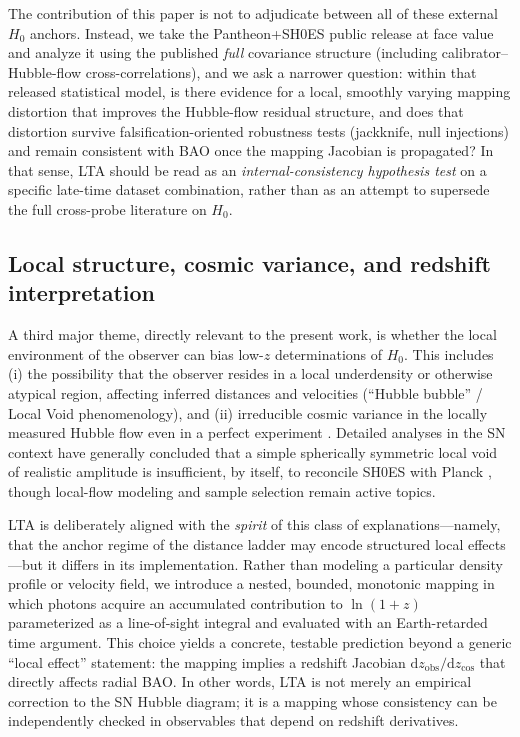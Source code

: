 \documentclass[10pt]{article}
\newcommand{\zobs}{z_{\mathrm{obs}}}
\newcommand{\zcos}{z_{\mathrm{cos}}}
\providecommand{\dd}{\mathrm{d}}
\begin{document}
The contribution of this paper is not to adjudicate between all of these external $H_0$ anchors.
Instead, we take the Pantheon+SH0ES public release at face value and analyze it using the published
\emph{full} covariance structure (including calibrator--Hubble-flow cross-correlations), and we ask
a narrower question: within that released statistical model, is there evidence for a local,
smoothly varying mapping distortion that improves the Hubble-flow residual structure, and does that
distortion survive falsification-oriented robustness tests (jackknife, null injections) and remain
consistent with BAO once the mapping Jacobian is propagated?
In that sense, LTA should be read as an \emph{internal-consistency hypothesis test} on a specific
late-time dataset combination, rather than as an attempt to supersede the full cross-probe
literature on $H_0$.

\subsection{Local structure, cosmic variance, and redshift interpretation}
A third major theme, directly relevant to the present work, is whether the local environment of the
observer can bias low-$z$ determinations of $H_0$.
This includes (i) the possibility that the observer resides in a local underdensity or otherwise
atypical region, affecting inferred distances and velocities (``Hubble bubble'' / Local Void
phenomenology), and (ii) irreducible cosmic variance in the locally measured Hubble flow even in a
perfect experiment \cite{WuHuterer2017SampleVariance}.
Detailed analyses in the SN context have generally concluded that a simple spherically symmetric
local void of realistic amplitude is insufficient, by itself, to reconcile SH0ES with Planck
\cite{Kenworthy2019LocalPerspective}, though local-flow modeling and sample selection remain active
topics.

LTA is deliberately aligned with the \emph{spirit} of this class of explanations—namely, that the
anchor regime of the distance ladder may encode structured local effects—but it differs in its
implementation.
Rather than modeling a particular density profile or velocity field, we introduce a nested,
bounded, monotonic mapping in which photons acquire an accumulated contribution to $\ln(1+z)$
parameterized as a line-of-sight integral and evaluated with an Earth-retarded time argument.
This choice yields a concrete, testable prediction beyond a generic ``local effect'' statement:
the mapping implies a redshift Jacobian $\dd\zobs/\dd\zcos$ that directly affects radial BAO.
In other words, LTA is not merely an empirical correction to the SN Hubble diagram; it is a mapping
whose consistency can be independently checked in observables that depend on redshift derivatives.
\end{document}
